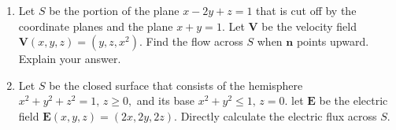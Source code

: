 \documentclass{article}
\begin{document}
\begin{enumerate}
    \item Let $S$ be the portion of the plane $x-2y+z=1$ that is cut off by the coordinate planes and the plane $x+y=1$. Let $\boldsymbol V$ be the velocity field $\boldsymbol V (x,y,z) = (y,z,x^2)$. Find the flow across $S$ when $\boldsymbol n$ points upward. Explain your answer.

    \item Let $S$ be the closed surface that consists of the hemisphere $x^2+y^2+z^2 = 1,\, z \geq 0,$ and its base $x^2 + y^2 \leq 1,\, z = 0.$ let $\boldsymbol E$ be the electric field $\boldsymbol E(x,y,z) = (2x,2y,2z).$ Directly calculate the electric flux across $S$.
        
\end{enumerate}
\end{document}
